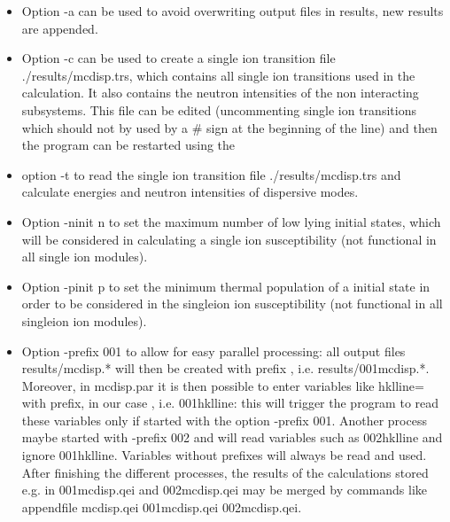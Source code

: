 \begin{description}
\begin{itemize}
				\item Option {\prg -a} can be used to avoid overwriting output files in results, new results
				are appended.
								
				\item Option {\prg -c}  can be used to create  a single ion
				transition file {\prg ./results/mcdisp.trs}, which contains
				all single ion transitions used in the calculation. It also contains the 
                                    neutron intensities of the non interacting subsystems. This file can
				be edited (uncommenting single ion transitions which should not
				by used by a \# sign at the beginning of the line)
				and then the program can be restarted using the 
				\item  option {\prg -t} to
				read the single ion transition file {\prg ./results/mcdisp.trs} and
				calculate energies and neutron intensities of dispersive modes.
				\item Option {\prg -ninit n} to set the maximum number of low lying
                                 initial states, which will be considered in calculating a single ion susceptibility (not functional
                                 in all single ion modules).
 \item Option {\prg -pinit p} to set the minimum thermal population of a 
                                 initial state in order to be considered in the singleion ion susceptibility (not functional in
                                 all singleion ion modules).
 \item Option {\prg -prefix 001} to allow for easy parallel processing: all output files {\prg results/mcdisp.*}
                  will then be created with prefix {}, i.e. {\prg results/001mcdisp.*}.
                  Moreover,  in {\prg mcdisp.par} it is then possible to enter
                  variables like {\prg hklline=}  with prefix, in our case {}, i.e. {\prg 001hklline}: this will trigger
                  the program to read these variables only if started with the option {\prg -prefix 001}. Another process
                  maybe started with {\prg -prefix 002} and will read variables such as {\prg 002hklline} and ignore {\prg 001hklline}.
                  Variables without prefixes will always be read and used.
                  After finishing the different processes, the results of the calculations stored e.g. in {\prg 001mcdisp.qei} and
                  {\prg 002mcdisp.qei} may be merged by commands like {\prg appendfile mcdisp.qei 001mcdisp.qei 002mcdisp.qei}.

\end{itemize}
\end{description}
